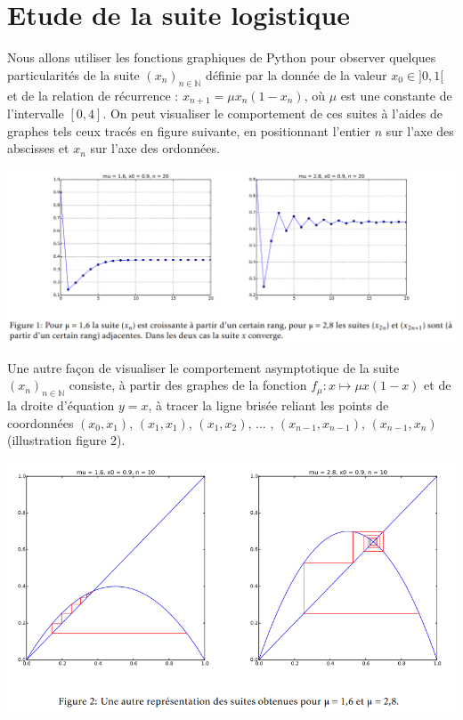 
\section*{Etude de la suite logistique}
Nous allons utiliser les fonctions graphiques de Python pour observer quelques particularités de la suite
$\left( x_n \right)_{n\in \mathbb{N}}$ 
définie par la donnée de la valeur $x_0 \in]0,1[$ et de la relation de récurrence : 
$x_{n+1} = \mu x_n\left(1 - x_n\right)$, 
où $\mu$ est une
constante de l’intervalle $\left[0,4\right]$.
On peut visualiser le comportement de ces suites à l’aides de graphes tels ceux tracés en figure suivante, en positionnant l’entier $n$ sur l’axe des abscisses et $x_n$ sur l’axe des ordonnées.

\begin{center}
\includegraphics[width=\linewidth]{fig_01}
\end{center}

Une autre façon de visualiser le comportement asymptotique de la suite $\left( x_n \right)_{n\in \mathbb{N}}$ consiste, à partir des graphes de la
fonction $f_{\mu} : x \mapsto \mu x(1 - x)$ et de la droite d’équation $y = x$, à tracer la ligne brisée reliant les points de coordonnées $(x_0, x_1)$,
$(x_1, x_1)$, $(x_1, x_2)$, ... , $\left(x_{n-1}, x_{n-1}\right)$, $\left(x_{n-1}, x_{n}\right)$ (illustration figure 2).

\begin{center}
\includegraphics[width=0.8\linewidth]{fig_02}
\end{center}

